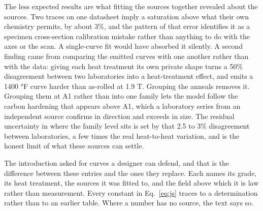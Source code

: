 \documentclass[
  11pt,
]{article}
\begin{document}
The less expected results are what fitting the sources together revealed about the sources. Two traces on one datasheet imply a saturation above what their own chemistry permits, by about 3\%, and the pattern of that error identifies it as a specimen cross-section calibration mistake rather than anything to do with the axes or the scan. A single-curve fit would have absorbed it silently. A second finding came from comparing the emitted curves with one another rather than with the data: giving each heat treatment its own private shape turns a 50\% disagreement between two laboratories into a heat-treatment effect, and emits a 1400 °F curve harder than as-rolled at 1.9 T. Grouping the anneals removes it. Grouping them at A1 rather than into one family lets the model follow the carbon hardening that appears above A1, which a laboratory series from an independent source confirms in direction and exceeds in size. The residual uncertainty in where the family level sits is set by that 2.5 to 3\% disagreement between laboratories, a few times the real heat-to-heat variation, and is the honest limit of what these sources can settle.

The introduction asked for curves a designer can defend, and that is the difference between these entries and the ones they replace. Each names its grade, its heat treatment, the sources it was fitted to, and the field above which it is law rather than measurement. Every constant in Eq.~\eqref{eq:js} traces to a determination rather than to an earlier table. Where a number has no source, the text says so.
\end{document}
